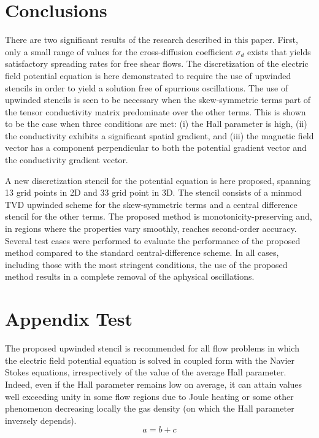 \documentclass[twoside,9pt,twocolumn]{aiaa}
\begin{document}
\section{Conclusions}

There are two significant results of the research described in this paper. First, only a small range of values for the cross-diffusion coefficient $\sigma_d$ exists that yields satisfactory spreading rates for free shear flows. 
The discretization of the electric field potential equation is here demonstrated to require the use of upwinded stencils in order to yield a solution free of spurrious oscillations. The use of upwinded stencils is seen to be necessary when the skew-symmetric terms part of the tensor conductivity matrix predominate over the other terms. This is shown to be the case when three conditions are met: (i) the Hall parameter is high, (ii) the conductivity exhibits a significant spatial gradient, and (iii) the magnetic field vector has a component perpendicular to both the potential gradient vector and the conductivity gradient vector. 

A new discretization stencil for the potential equation is here proposed, spanning 13 grid points in 2D and 33 grid point in 3D. The stencil consists of a minmod TVD upwinded scheme for the skew-symmetric terms and a central difference stencil for the other terms. The proposed method is monotonicity-preserving  and, in regions where the properties vary smoothly, reaches second-order accuracy. Several test cases were performed to evaluate the performance of the proposed method compared to the standard central-difference scheme. In all cases, including those with the most stringent conditions, the use of the proposed method results in a complete removal of the aphysical oscillations.  

\appendix
\section{Appendix Test}   

The proposed upwinded stencil  is recommended for all flow problems in which the electric field potential equation is solved in coupled form with the Navier Stokes equations, irrespectively of the value of the average Hall parameter. Indeed, even if the Hall parameter remains low on average, it can attain values well exceeding unity in some flow regions due to Joule heating or some other phenomenon decreasing locally the gas density (on which the Hall parameter inversely depends).  
%
\begin{equation}
a=b+c
\end{equation}
%




    
\end{document}
